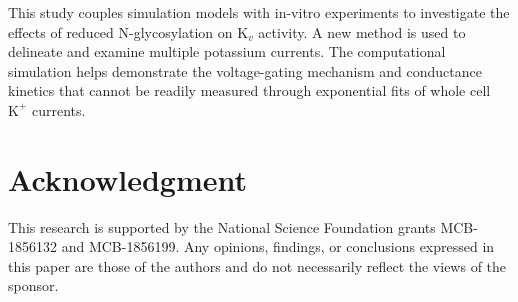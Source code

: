 \documentclass[journal]{IEEEtran}
\begin{document}
This study couples simulation models with in-vitro experiments to investigate the effects of reduced N-glycosylation on $\text{K}_{v}$ activity. A new method is used to delineate and examine multiple potassium currents. The computational simulation helps demonstrate the voltage-gating mechanism and conductance kinetics that cannot be readily measured through exponential fits of whole cell $\text{K}^{+}$ currents. 

\section*{Acknowledgment}
This research is supported by the National Science Foundation grants MCB-1856132 and MCB-1856199. Any opinions, findings, or conclusions expressed in this paper are those of the authors and do not necessarily reflect the views of the sponsor.


%

\end{document}
